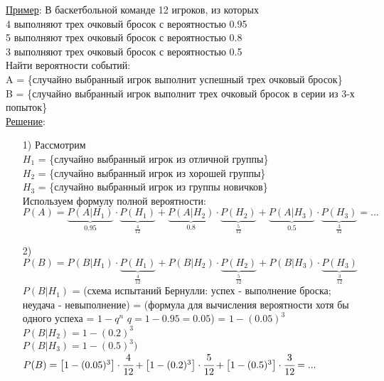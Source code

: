 \underline{Пример}: В баскетбольной команде 12 игроков, из которых \\
4 выполняют трех очковый бросок с вероятностью 0.95 \\
5 выполняют трех очковый бросок с вероятностью 0.8 \\
3 выполняют трех очковый бросок с вероятностью 0.5 \\
Найти вероятности событий: \\
A = \{случайно выбранный игрок выполнит успешный трех очковый бросок\} \\
B = \{случайно выбранный игрок выполнит трех очковый бросок в серии из 3-х попыток\} \\
\underline{Решение}: \\
\begin{enumerate}
\item[1)] Рассмотрим \\
$H_1$ = \{случайно выбранный игрок из отличной группы\} \\
$H_2$ = \{случайно выбранный игрок из хорошей группы\} \\
$H_3$ = \{случайно выбранный игрок из группы новичков\} \\

Используем формулу полной вероятности: \\
$P(A) = \underbrace{P(A|H_1)}_{0.95} \cdot \underbrace{P(H_1)}_{\tfrac{4}{12}} + \underbrace{P(A|H_2)}_{0.8} \cdot \underbrace{P(H_2)}_{\tfrac{5}{12}} + \underbrace{P(A|H_3)}_{0.5} \cdot \underbrace{P(H_3)}_{\tfrac{3}{12}} = ...$ \\

\item[2)] $P(B) = P(B|H_1) \cdot \underbrace{P(H_1)}_{\tfrac{4}{12}} + P(B|H_2) \cdot \underbrace{P(H_2)}_{\tfrac{5}{12}} + P(B|H_3) \cdot \underbrace{P(H_3)}_{\tfrac{3}{12}}$ \\
$P(B|H_1)$ = (схема испытаний Бернулли: успех - выполнение броска; неудача - невыполнение) = (формула для вычисления вероятности хотя бы одного успеха = $1 - q^n$ $q = 1 - 0.95 = 0.05$) = $1 - (0.05)^3$ \\
$P(B|H_2) = 1 - (0.2)^3$ \\
$P(B|H_3) = 1 - (0.5)^3)$ \\
$P(B) = \left[ 1 - (0.05)^3 \right] \cdot \cfrac{4}{12} + \left[1 - (0.2)^3 \right] \cdot \cfrac{5}{12} + \left[1 - (0.5)^3 \right] \cdot \cfrac{3}{12} = ...$
\end{enumerate}



